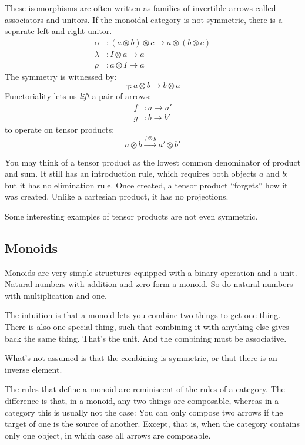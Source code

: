 \documentclass[DaoFP]{subfiles}
\begin{document}
These isomorphisms are often written as families of invertible arrows called associators and unitors. If the monoidal category is not symmetric, there is a separate left and right unitor.
\begin{align*}
\alpha &\colon (a \otimes b) \otimes c \to a \otimes (b \otimes c)
\\
 \lambda &\colon I \otimes a \to a
 \\
 \rho &\colon a \otimes I \to a
\end{align*}
The symmetry is witnessed by:
\[ \gamma \colon a \otimes b \to b \otimes a \]
Functoriality lets us \emph{lift} a pair of arrows:
\begin{align*} 
f &\colon a \to a' \\
g &\colon b \to b'
\end{align*}
 to operate on tensor products:
\[ a \otimes b \xrightarrow{f \otimes g} a' \otimes b' \]

You may think of a tensor product as the lowest common denominator of product and sum. It still has an introduction rule, which requires both objects $a$ and $b$; but it has no elimination rule. Once created, a tensor product ``forgets'' how it was created. Unlike a cartesian product, it has no projections. 

Some interesting examples of tensor products are not even symmetric. 

\subsection{Monoids}

Monoids are very simple structures equipped with a binary operation and a unit. Natural numbers with addition and zero form a monoid. So do natural numbers with multiplication and one. 

The intuition is that a monoid lets you combine two things to get one thing. There is also one special thing, such that combining it with anything else gives back the same thing. That's the unit. And the combining must be associative. 

What's not assumed is that the combining is symmetric, or that there is an inverse element.

The rules that define a monoid are reminiscent of the rules of a category. The difference is that, in a monoid, any two things are composable, whereas in a category this is usually not the case: You can only compose two arrows if the target of one is the source of another. Except, that is, when the category contains only one object, in which case all arrows are composable.
\end{document}
